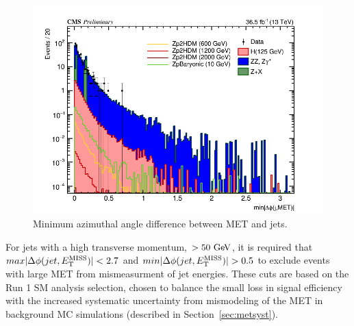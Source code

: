\begin{figure}[tbh]
\centering
\includegraphics[width=5in]{figures/hist_hDPHI_MIN_JET_MET_8.png}
\caption{Minimum azimuthal angle difference between MET and jets.}
\label{fig:mindeltaphijmet}
\end{figure}

For jets with a high transverse momentum, $>50\ \mathrm{Ge\kern -0.1em V}$, it is required that $max|\Delta\phi(jet, E_{\rm{T}}^{\rm{MISS}})|<2.7$ and $min|\Delta\phi(jet, E_{\rm{T}}^{\rm{MISS}})|>0.5$ to exclude events with large MET from mismeasurment of jet energies. These cuts are based on the Run 1 SM analysis selection, chosen to balance the small loss in signal efficiency with the increased systematic uncertainty from mismodeling of the MET in background MC simulations (described in Section~\ref{sec:metsyst}).

